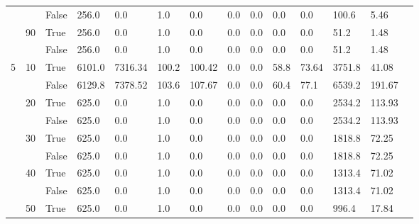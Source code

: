 \documentclass{article}
\begin{document}
\begin{landscape}
\begin{small}
\begin{longtable}[c]{@{}lll|ll|ll|ll|ll|lll@{}}
   &    & False & 256.0           & 0.0            & 1.0           & 0.0           & 0.0           & 0.0           & 0.0           & 0.0           & 100.6         & 5.46        &  \\
   & 90 & True  & 256.0           & 0.0            & 1.0           & 0.0           & 0.0           & 0.0           & 0.0           & 0.0           & 51.2          & 1.48        &  \\
   &    & False & 256.0           & 0.0            & 1.0           & 0.0           & 0.0           & 0.0           & 0.0           & 0.0           & 51.2          & 1.48        &  \\
  \midrule
5  & 10 & True  & 6101.0          & 7316.34        & 100.2         & 100.42        & 0.0           & 0.0           & 58.8          & 73.64         & 3751.8        & 41.08       &  \\
   &    & False & 6129.8          & 7378.52        & 103.6         & 107.67        & 0.0           & 0.0           & 60.4          & 77.1          & 6539.2        & 191.67      &  \\
   & 20 & True  & 625.0           & 0.0            & 1.0           & 0.0           & 0.0           & 0.0           & 0.0           & 0.0           & 2534.2        & 113.93      &  \\
   &    & False & 625.0           & 0.0            & 1.0           & 0.0           & 0.0           & 0.0           & 0.0           & 0.0           & 2534.2        & 113.93      &  \\
   & 30 & True  & 625.0           & 0.0            & 1.0           & 0.0           & 0.0           & 0.0           & 0.0           & 0.0           & 1818.8        & 72.25       &  \\
   &    & False & 625.0           & 0.0            & 1.0           & 0.0           & 0.0           & 0.0           & 0.0           & 0.0           & 1818.8        & 72.25       &  \\
   & 40 & True  & 625.0           & 0.0            & 1.0           & 0.0           & 0.0           & 0.0           & 0.0           & 0.0           & 1313.4        & 71.02       &  \\
   &    & False & 625.0           & 0.0            & 1.0           & 0.0           & 0.0           & 0.0           & 0.0           & 0.0           & 1313.4        & 71.02       &  \\
   & 50 & True  & 625.0           & 0.0            & 1.0           & 0.0           & 0.0           & 0.0           & 0.0           & 0.0           & 996.4         & 17.84       &  \\

\end{longtable}
\end{small}
\end{landscape}
\end{document}

